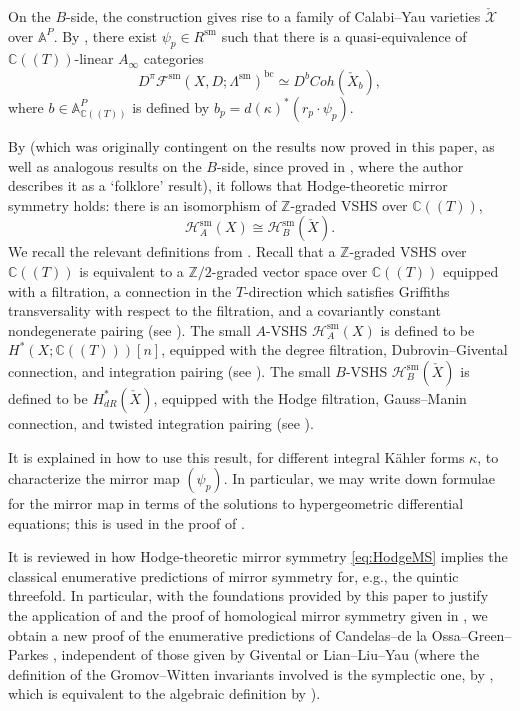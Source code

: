 \documentclass{article}
\def\fuk{\EuF}
\def\bc{\mathsf{bc}}
\def\nov{r}
\def\Z{\mathbb{Z}}
\def\fuk{\mathcal{F}}
\def\bc{{\operatorname{bc}}}
\def\C{\mathbb{C}}
\def\sm{{\operatorname{sm}}}
\begin{document}
On the $B$-side, the construction gives rise to a family of Calabi--Yau varieties $\check{\mathcal{X}}$ over $\mathbb{A}^P$. 
By \cite[Theorem C]{Ganatra2023integrality}, there exist $\psi_p \in R^\sm$ such that there is a quasi-equivalence of $\C((T))$-linear $A_\infty$ categories
$$D^\pi\fuk^\sm(X,D;\Lambda^\sm)^\bc \simeq D^bCoh(\check{X}_b),$$
where $b \in \mathbb{A}^P_{\C((T))}$ is defined by $b_p = d(\kappa)^*(\nov_p \cdot \psi_p)$. 

By \cite[Theorem A]{Ganatra2015} (which was originally contingent on the results now proved in this paper, as well as analogous results on the $B$-side, since proved in \cite{Tu:HKR}, where the author describes it as a `folklore' result), it follows that Hodge-theoretic mirror symmetry holds: there is an isomorphism of $\Z$-graded VSHS over $\C((T))$,
\begin{equation}\label{eq:HodgeMS}
    \mathcal{H}_A^\sm(X) \cong \mathcal{H}_B^\sm(\check{X}).
\end{equation}
We recall the relevant definitions from \cite{Ganatra2015}. 
Recall that a $\Z$-graded VSHS over $\C((T))$ is equivalent to a $\Z/2$-graded vector space over $\C((T))$ equipped with a filtration, a connection in the $T$-direction which satisfies Griffiths transversality with respect to the filtration, and a covariantly constant nondegenerate pairing (see \cite[Lemma 2.7]{Ganatra2015}).  
The small $A$-VSHS $\mathcal{H}_A^\sm(X)$ is defined to be $H^*(X;\C((T)))[n]$, equipped with the degree filtration, Dubrovin--Givental connection, and integration pairing (see \cite[Definition 3.1]{Ganatra2015}). 
The small $B$-VSHS $\mathcal{H}_B^\sm(\check{X})$ is defined to be $H^*_{dR}(\check{X})$, equipped with the Hodge filtration, Gauss--Manin connection, and twisted integration pairing (see \cite[Definition 3.6]{Ganatra2015}). 

It is explained in \cite[Appendix C]{Sheridan2017} how to use this result, for different integral K\"ahler forms $\kappa$, to characterize the mirror map $(\psi_p)$. 
In particular, we may write down formulae for the mirror map in terms of the solutions to hypergeometric differential equations; this is used in the proof of \cite[Theorem B]{Ganatra2023integrality}. 

It is reviewed in \cite{Ganatra2015} how Hodge-theoretic mirror symmetry \eqref{eq:HodgeMS} implies the classical enumerative predictions of mirror symmetry for, e.g., the quintic threefold. 
In particular, with the foundations provided by this paper to justify the application of \cite[Theorem A]{Ganatra2015} and the proof of homological mirror symmetry given in \cite{sheridan2015homological}, we obtain a new proof of the enumerative predictions of Candelas--de la Ossa--Green--Parkes \cite{CdlOGP}, independent of those given by Givental \cite{Givental:EGW} or Lian--Liu--Yau \cite{LLY,LLY2,LLY3,LLY4} (where the definition of the Gromov--Witten invariants involved is the symplectic one, by \cite[Lemma 5.4]{relfukii}, which is equivalent to the algebraic definition by \cite{LiTian}).
\end{document}
